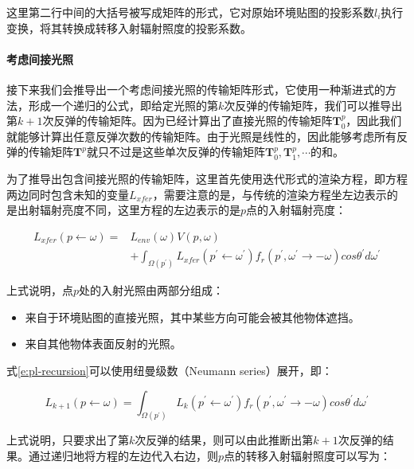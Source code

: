这里第二行中间的大括号被写成矩阵的形式，它对原始环境贴图的投影系数$l_i$执行变换，将其转换成转移入射辐射照度的投影系数。



\paragraph{考虑间接光照}
接下来我们会推导出一个考虑间接光照的传输矩阵形式，它使用一种渐进式的方法，形成一个递归的公式，即给定光照的第$k$次反弹的传输矩阵，我们可以推导出第$k+1$次反弹的传输矩阵。因为已经计算出了直接光照的传输矩阵$\mathbf{T}^{p}_0$，因此我们就能够计算出任意反弹次数的传输矩阵。由于光照是线性的，因此能够考虑所有反弹的传输矩阵$\mathbf{T}^{p}$就只不过是这些单次反弹的传输矩阵$\mathbf{T}^{p}_0,\mathbf{T}^{p}_1,\cdots$的和。

为了推导出包含间接光照的传输矩阵，这里首先使用迭代形式的渲染方程，即方程两边同时包含未知的变量$L_{xfer}$，需要注意的是，与传统的渲染方程坐左边表示的是出射辐射亮度不同，这里方程的左边表示的是$p$点的入射辐射亮度：

\begin{equation}\label{e:pl-recursion}
\begin{aligned}
	L_{xfer}(p\leftarrow\omega)=&L_{env}(\omega)V(p,\omega)\\
	&+\int_{\Omega (p^{'})}L_{xfer}(p^{'}\leftarrow\omega^{'})f_r(p^{'},\omega^{'}\to -\omega)cos\theta^{'}d\omega^{'}
\end{aligned}
\end{equation}

上式说明，点$p$处的入射光照由两部分组成：

\begin{itemize}
	\item 来自于环境贴图的直接光照，其中某些方向可能会被其他物体遮挡。
	\item 来自其他物体表面反射的光照。
\end{itemize}

式\ref{e:pl-recursion}可以使用纽曼级数（Neumann series）展开，即：

\begin{equation}
	L_{k+1}(p\leftarrow\omega)=\int_{\Omega (p^{'})}L_k(p^{'}\leftarrow\omega^{'})f_r(p^{'},\omega^{'}\to -\omega)cos\theta^{'}d\omega^{'}
\end{equation}

上式说明，只要求出了第$k$次反弹的结果，则可以由此推断出第$k+1$次反弹的结果。通过递归地将方程的左边代入右边，则$p$点的转移入射辐射照度可以写为：

